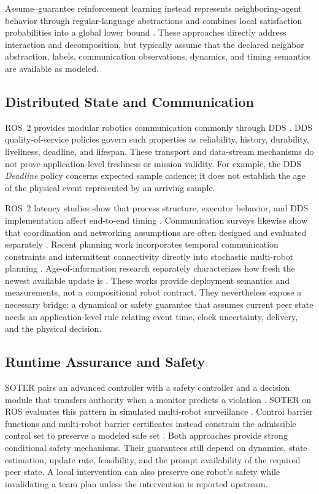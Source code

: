Assume--guarantee reinforcement learning instead represents neighboring-agent
behavior through regular-language abstractions and combines local satisfaction
probabilities into a global lower bound \cite{kazemi2024agrl}.  These approaches
directly address interaction and decomposition, but typically assume that the
declared neighbor abstraction, labels, communication observations, dynamics,
and timing semantics are available as modeled.

\subsection{Distributed State and Communication}

ROS~2 provides modular robotics communication commonly through DDS
\cite{macenski2022ros2,omg2015dds}.  DDS quality-of-service policies govern such
properties as reliability, history, durability, liveliness, deadline, and
lifespan.  These transport and data-stream mechanisms do not prove
application-level freshness or mission validity.  For example, the DDS
\emph{Deadline} policy concerns expected sample cadence; it does not establish
the age of the physical event represented by an arriving sample.

ROS~2 latency studies show that process structure, executor behavior, and DDS
implementation affect end-to-end timing
\cite{maruyama2016ros2,kronauer2021latency}.  Communication surveys likewise
show that coordination and networking assumptions are often designed and
evaluated separately \cite{gielis2022communications}.  Recent planning work
incorporates temporal communication constraints and intermittent connectivity
directly into stochastic multi-robot planning \cite{silva2026probabilistic}.
Age-of-information research
separately characterizes how fresh the newest available update is
\cite{kaul2012aoi}.  These works provide deployment semantics and measurements,
not a compositional robot contract.  They nevertheless expose a necessary
bridge: a dynamical or safety guarantee that assumes current peer state needs an
application-level rule relating event time, clock uncertainty, delivery, and
the physical decision.

\subsection{Runtime Assurance and Safety}

SOTER pairs an advanced controller with a safety controller and a decision
module that transfers authority when a monitor predicts a violation
\cite{desai2019soter}.  SOTER on ROS evaluates this pattern in simulated
multi-robot surveillance \cite{shivakumar2020soterros}.  Control barrier
functions and multi-robot barrier certificates instead constrain the admissible
control set to preserve a modeled safe set
\cite{ames2017cbf,wang2017barrier}.  Both approaches provide strong conditional
safety mechanisms.  Their guarantees still depend on dynamics, state
estimation, update rate, feasibility, and the prompt availability of the
required peer state.  A local intervention can also preserve one robot's safety
while invalidating a team plan unless the intervention is reported upstream.

